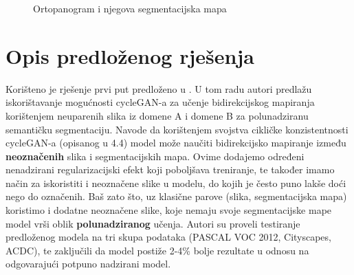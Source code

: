 \begin{figure}%
    \qquad
    \caption{Ortopanogram i njegova segmentacijska mapa}%
    \label{fig:example}%
\end{figure}



\section{Opis predloženog rješenja}
Korišteno je rješenje prvi put predloženo u \citep{cycleGANSegmentation}. U tom radu autori predlažu iskorištavanje mogućnosti cycleGAN-a za učenje bidirekcijskog mapiranja korištenjem neuparenih slika iz domene A i domene B za polunadziranu semantičku segmentaciju. Navode da korištenjem svojstva cikličke konzistentnosti cycleGAN-a (opisanog u 4.4) model može naučiti bidirekcijsko mapiranje između \textbf{neoznačenih} slika i segmentacijskih mapa. Ovime dodajemo određeni nenadzirani regularizacijski efekt koji poboljšava treniranje, te također imamo način za iskoristiti i neoznačene slike u modelu, do kojih je često puno lakše doći nego do označenih. Baš zato što, uz klasične parove (slika, segmentacijska mapa) koristimo i dodatne neoznačene slike, koje nemaju svoje segmentacijske mape model vrši oblik \textbf{polunadziranog}  učenja. Autori su proveli testiranje predloženog modela na tri skupa podataka (PASCAL VOC 2012, Cityscapes, ACDC), te zaključili da model postiže 2-4\% bolje rezultate u odnosu na odgovarajući potpuno nadzirani model.


